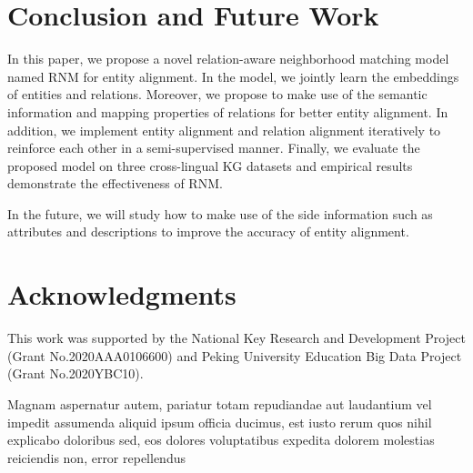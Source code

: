 \documentclass[letterpaper]{article} %
\begin{document}
\section{Conclusion and Future Work}

In this paper, we propose a novel relation-aware neighborhood
matching model named RNM for entity alignment. In the model,
we jointly learn the embeddings of entities and relations.
Moreover, we propose to make use of the semantic information
and mapping properties of relations for better entity alignment.
In addition, we implement entity
alignment and relation alignment iteratively to reinforce each other
in a semi-supervised manner. Finally, we evaluate
the proposed model on three cross-lingual KG datasets and empirical
results demonstrate the effectiveness of RNM.

In the future, we will study how to make use of the side information such as
attributes \cite{zhang2019multi} and descriptions \cite{yang2019aligning}
to improve the accuracy of entity alignment.


\section{Acknowledgments}

This work was supported by the National Key Research and
Development Project (Grant No.2020AAA0106600) and
Peking University Education Big Data Project (Grant No.2020YBC10).


Magnam aspernatur autem, pariatur totam repudiandae aut laudantium vel impedit assumenda aliquid ipsum officia ducimus, est iusto rerum quos nihil explicabo doloribus sed, eos dolores voluptatibus expedita dolorem molestias reiciendis non, error repellendus

\end{document}
